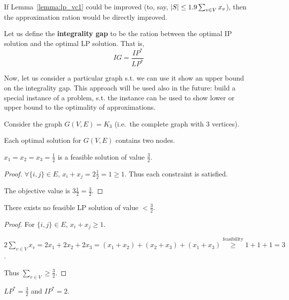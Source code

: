     If Lemma~\ref{lemma:lp_vc1} could be improved (to, say, $\vert S \vert \leq 1.9 \sum_{v \in V} x_v$), then the approximation ration would be directly improved.

    Let us define the \textbf{integrality gap} to be the ration between the optimal IP solution and the optimal LP solution. That is,
    \[ IG = \frac{IP^*}{LP^* } \]

    Now, let us consider a particular graph s.t. we can use it show an upper bound on the integrality gap.
    This approach will be used also in the future: build a special instance of a problem, s.t. the instance can be used to show lower or upper bound to the optimality of approximations.

    Consider the graph $G(V,E) = K_3$ (i.e.~the complete graph with $3$ vertices).

    \begin{lemma}
        Each optimal solution for $G(V,E)$ contains two nodes.
    \end{lemma}

    \begin{lemma}
        $x_1 = x_2 = x_3 = \frac{1}{2}$ is a feasible solution of value $\frac{3}{2}$.
    \end{lemma}

    \begin{proof}
        $\forall \{ i,j \} \in E$, $x_i + x_j = 2 \frac{1}{2} = 1 \geq 1$. Thus each constraint is satisfied.

        The objective value is $3 \frac{1}{2} = \frac{3}{2}$.
    \end{proof}

    \begin{lemma}
        There exists no feasible LP solution of value $< \frac{3}{2}$.
    \end{lemma}

    \begin{proof}
        For $\{ i,j \} \in E$, $x_i + x_j \geq 1$.

        $2 \sum_{v \in V} x_v = 2 x_1 + 2 x_2 + 2 x_3 = (x_1 + x_2) + (x_2 + x_3) + (x_1 + x_3) \overset{\text{feasibility}}{\geq} 1 + 1 + 1 = 3 $.

        Thus $\sum_{v \in V} \geq \frac{3}{2}$.
    \end{proof}

    \begin{corollary}
        $LP^* = \frac{3}{2}$ and $IP^* = 2$.
    \end{corollary}

